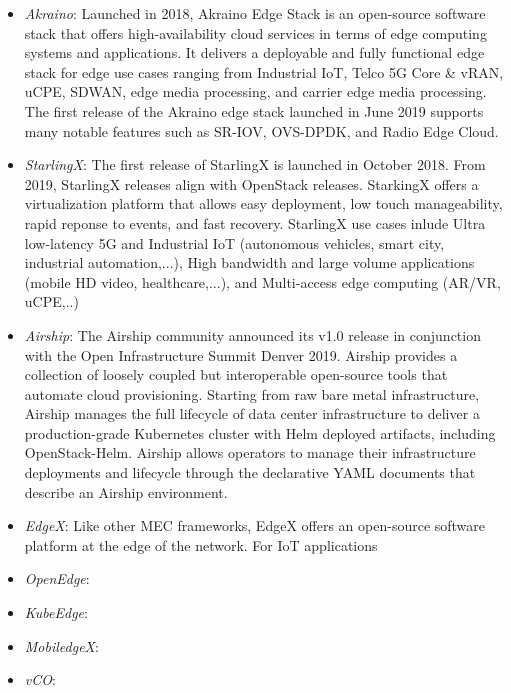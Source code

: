 \begin{itemize}

\item \textit{\textit{Akraino}}: Launched in 2018, Akraino Edge Stack is an open-source software stack that offers high-availability cloud services in terms of edge computing systems and applications. It delivers a deployable and fully functional edge stack for edge use cases ranging from Industrial IoT, Telco 5G Core \& vRAN, uCPE, SDWAN, edge media processing, and carrier edge media processing. The first release of the Akraino edge stack launched in June 2019 supports many notable features such as SR-IOV, OVS-DPDK, and Radio Edge Cloud.  

\item \textit{\textit{StarlingX}}: The first release of StarlingX is launched in October 2018. From 2019, StarlingX releases align with OpenStack releases. StarkingX offers a virtualization platform that allows easy deployment, low touch manageability, rapid reponse to events, and fast recovery. StarlingX use cases inlude Ultra low-latency 5G and Industrial IoT (autonomous vehicles, smart city, industrial automation,...), High bandwidth and large volume applications (mobile HD video, healthcare,...), and Multi-access edge computing (AR/VR, uCPE,..)

\item \textit{\textit{Airship}}: The Airship community announced its v1.0 release in conjunction with the Open Infrastructure Summit Denver 2019. Airship provides a collection of loosely coupled but interoperable open-source tools that automate cloud provisioning. Starting from raw bare metal infrastructure, Airship manages the full lifecycle of data center infrastructure to deliver a production-grade Kubernetes cluster with Helm deployed artifacts, including OpenStack-Helm. Airship allows operators to manage their infrastructure deployments and lifecycle through the declarative YAML documents that describe an Airship environment.

\item \textit{\textit{EdgeX}}: Like other MEC frameworks, EdgeX offers an open-source software platform at the edge of the network. For IoT applications

\item \textit{\textit{OpenEdge}}:

\item \textit{\textit{KubeEdge}}:

\item \textit{\textit{MobiledgeX}}:

\item \textit{\textit{vCO}}:

\end{itemize}

